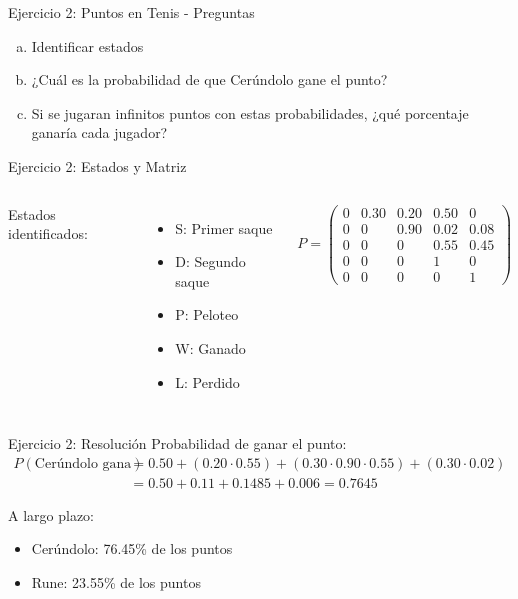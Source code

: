 \documentclass{beamer}
\begin{document}
\begin{frame}{Ejercicio 2: Puntos en Tenis - Preguntas}
    \begin{enumerate}[a)]
        \item Identificar estados
        \item ¿Cuál es la probabilidad de que Cerúndolo gane el punto?
        \item Si se jugaran infinitos puntos con estas probabilidades, ¿qué porcentaje ganaría cada jugador?
    \end{enumerate}
\end{frame}

\begin{frame}{Ejercicio 2: Estados y Matriz}
    \begin{columns}
        Estados identificados:
        \begin{itemize}
            \item S: Primer saque
            \item D: Segundo saque
            \item P: Peloteo
            \item W: Ganado
            \item L: Perdido
        \end{itemize}
        
        \[P = \begin{pmatrix}
        0 & 0.30 & 0.20 & 0.50 & 0 \\
        0 & 0 & 0.90 & 0.02 & 0.08 \\
        0 & 0 & 0 & 0.55 & 0.45 \\
        0 & 0 & 0 & 1 & 0 \\
        0 & 0 & 0 & 0 & 1
        \end{pmatrix}\]
    \end{columns}
\end{frame}

\begin{frame}{Ejercicio 2: Resolución}
    Probabilidad de ganar el punto:
    \[
    \begin{split}
    P(\text{Cerúndolo gana}) &= 0.50 + (0.20 \cdot 0.55) + (0.30 \cdot 0.90 \cdot 0.55) + (0.30 \cdot 0.02) \\
    &= 0.50 + 0.11 + 0.1485 + 0.006 = 0.7645
    \end{split}
    \]
    
    A largo plazo:
    \begin{itemize}
        \item Cerúndolo: 76.45\% de los puntos
        \item Rune: 23.55\% de los puntos
    \end{itemize}
\end{frame}
\end{document}

